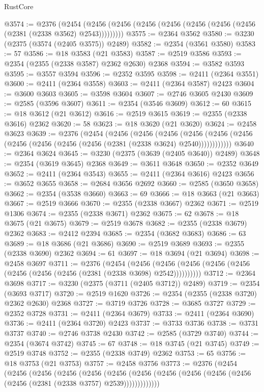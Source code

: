 \begin{lexlean}{RustCore}
\begin{coremodule}
@3574 := @2376
    (@2454 (@2456 (@2456 (@2456 (@2456 (@2456 (@2456 (@2456 (@2381 (@2338 @3562) @2543)))))))))
@3575 := @2364 @3562
@3580 := @3230 (@2375 (@3574 (@2405 @3575)) @2489)
@3582 := @2354 (@3561 @3580)
@3583 := 57
@3586 := @18 @3583 (@21 @3583)
@3587 := @2519 @3586
@3593 := @2354 (@2355 (@2338 @3587) @2362 @2630) @2368
@3594 := @3582 @3593
@3595 := @3557 @3594
@3596 := @2352 @3595
@3598 := @2411 (@2364 @3551)
@3600 := @2411 (@2364 @3558)
@3603 := @2411 (@2364 @3587) @2423
@3604 := @3600 @3603
@3605 := @3598 @3604
@3607 := @2746 @3605 @2430
@3609 := @2585 (@3596 @3607)
@3611 := @2354 (@3546 @3609)
@3612 := 60
@3615 := @18 @3612 (@21 @3612)
@3616 := @2519 @3615
@3619 := @2355 (@2338 @3616) @2362
@3620 := 58
@3623 := @18 @3620 (@21 @3620)
@3624 := @2458 @3623
@3639 := @2376
    (@2454
      (@2456
        (@2456
          (@2456
            (@2456 (@2456 (@2456 (@2456 (@2456 (@2456 (@2456 (@2381 (@2338 @3624) @2540))))))))))))
@3640 := @2364 @3624
@3645 := @3230 (@2375 (@3639 (@2405 @3640)) @2489)
@3648 := @2354 (@3619 @3645) @2368
@3649 := @3611 @3648
@3650 := @2352 @3649
@3652 := @2411 (@2364 @3543)
@3655 := @2411 (@2364 @3616) @2423
@3656 := @3652 @3655
@3658 := @2684 @3656 @2692
@3660 := @2585 (@3650 @3658)
@3662 := @2354 (@3538 @3660)
@3663 := 69
@3666 := @18 @3663 (@21 @3663)
@3667 := @2519 @3666
@3670 := @2355 (@2338 @3667) @2362
@3671 := @2519 @1306
@3674 := @2355 (@2338 @3671) @2362
@3675 := 62
@3678 := @18 @3675 (@21 @3675)
@3679 := @2519 @3678
@3682 := @2355 (@2338 @3679) @2362
@3683 := @2412 @2394
@3685 := @2354 (@3682 @3683)
@3686 := 63
@3689 := @18 @3686 (@21 @3686)
@3690 := @2519 @3689
@3693 := @2355 (@2338 @3690) @2362
@3694 := 61
@3697 := @18 @3694 (@21 @3694)
@3698 := @2458 @3697
@3711 := @2376
    (@2454
      (@2456 (@2456 (@2456 (@2456 (@2456 (@2456 (@2456 (@2456 (@2381 (@2338 @3698) @2542))))))))))
@3712 := @2364 @3698
@3717 := @3230 (@2375 (@3711 (@2405 @3712)) @2489)
@3719 := @2354 (@3693 @3717)
@3720 := @2519 @1620
@3726 := @2354 (@2355 (@2338 @3720) @2362 @2630) @2368
@3727 := @3719 @3726
@3728 := @3685 @3727
@3729 := @2352 @3728
@3731 := @2411 (@2364 @3679)
@3733 := @2411 (@2364 @3690)
@3736 := @2411 (@2364 @3720) @2423
@3737 := @3733 @3736
@3738 := @3731 @3737
@3740 := @2746 @3738 @2430
@3742 := @2585 (@3729 @3740)
@3744 := @2354 (@3674 @3742)
@3745 := 67
@3748 := @18 @3745 (@21 @3745)
@3749 := @2519 @3748
@3752 := @2355 (@2338 @3749) @2362
@3753 := 65
@3756 := @18 @3753 (@21 @3753)
@3757 := @2458 @3756
@3773 := @2376
    (@2454
      (@2456
        (@2456
          (@2456
            (@2456
              (@2456
                (@2456 (@2456 (@2456 (@2456 (@2456 (@2456 (@2381 (@2338 @3757) @2539)))))))))))))

\end{coremodule}
\end{lexlean}
